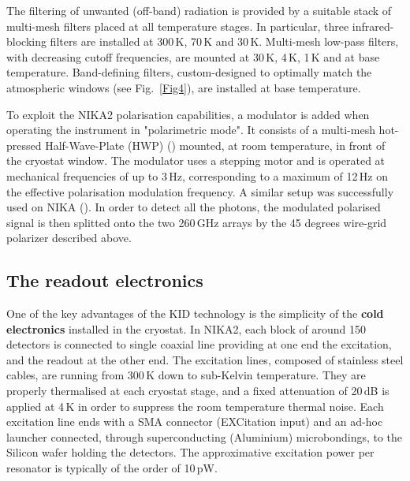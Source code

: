 \documentclass[]{aa} %
\begin{document}
The filtering of unwanted (off-band) radiation is provided by a suitable stack of multi-mesh filters placed at all temperature stages. In particular, three infrared-blocking filters are installed at 300\,K, 70\,K and 30\,K. Multi-mesh low-pass filters, with decreasing cutoff frequencies, are mounted at 30\,K, 4\,K, 1\,K and at base temperature. Band-defining filters, custom-designed to optimally match the atmospheric windows (see Fig.~\ref{Fig4}), are installed at base temperature. 

To exploit the NIKA2 polarisation capabilities, a modulator is added when operating the instrument in "polarimetric mode". It consists of a multi-mesh hot-pressed Half-Wave-Plate (HWP) (\cite{Pisano2008}) mounted, at room temperature, in front of the cryostat window. The modulator uses a stepping motor and is operated at mechanical frequencies of up to 3\,Hz, corresponding to a maximum of 12\,Hz on the effective polarisation modulation frequency. A similar setup was successfully used on NIKA (\cite{Ritacco2017}). In order to detect all the photons, the modulated polarised signal is then splitted onto the two 260\,GHz arrays by the 45 degrees wire-grid polarizer described above.  


 \subsection{The readout electronics}
 \label{The readout electronics}

One of the key advantages of the KID technology is the simplicity of the {\bf{cold electronics}} installed in the cryostat.
In NIKA2, each block of around 150 detectors is connected to single coaxial line providing at one end the excitation, and the readout at the other end. The excitation lines, composed of stainless steel cables, are running from 300\,K down to sub-Kelvin temperature. They are properly thermalised at each cryostat stage, and a fixed attenuation of 20\,dB is applied at 4\,K in order to suppress the room temperature thermal noise. Each excitation line ends with a SMA connector (EXCitation input) and an ad-hoc launcher connected, through superconducting (Aluminium) microbondings, to the Silicon wafer holding the detectors. The approximative excitation power per resonator is typically of the order of 10\,pW.
\end{document}
